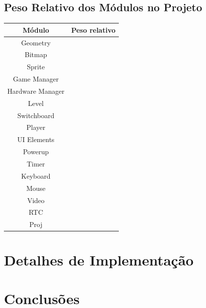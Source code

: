 \documentclass{report}
\begin{document}
\section{Peso Relativo dos Módulos no Projeto}

\begin{center}
	\begin{tabular}{|c|c|} 
		\hline
			Módulo & Peso relativo \\ 
		\hline
		\hline
			Geometry & \\
			Bitmap & \\
			Sprite & \\
			Game Manager & \\
			Hardware Manager & \\
			Level & \\
			Switchboard & \\ 
			Player & \\
			UI Elements & \\
			Powerup & \\
			Timer & \\
			Keyboard & \\
			Mouse & \\
			Video & \\
			RTC & \\
			Proj & \\
		\hline
	\end{tabular}
\end{center}

\chapter{Detalhes de Implementação}


\chapter{Conclusões}

\paragraph{}
\end{document}
